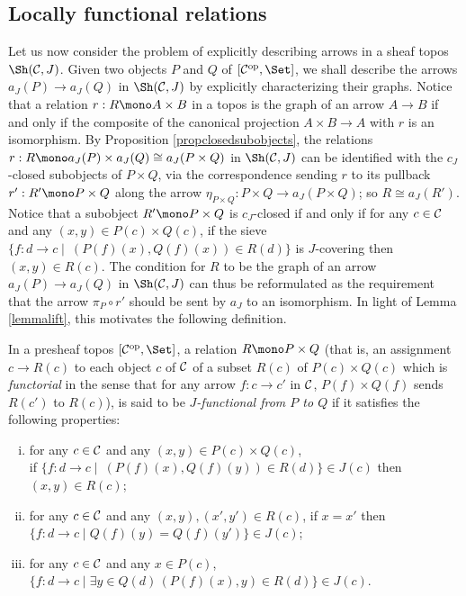 \documentclass[a4paper,12pt]{article}
\begin{document}
\subsection{Locally functional relations}

Let us now consider the problem of explicitly describing arrows in a sheaf topos $\Sh({\cal C}, J)$. Given two objects $P$ and $Q$ of $[{\cal C}^{\textup{op}}, \Set]$, we shall describe the arrows $a_{J}(P)\to a_{J}(Q)$ in $\Sh({\cal C}, J)$ by explicitly characterizing their graphs. Notice that a relation $r:R\mono A\times B$ in a topos is the graph of an arrow $A\to B$ if and only if the composite of the canonical projection $A\times B \to A$ with $r$ is an isomorphism. By Proposition \ref{propclosedsubobjects}, the relations $r:R\mono a_{J}(P)\times a_{J}(Q)\cong a_{J}(P\times Q)$ in $\Sh({\cal C}, J)$ can be identified with the $c_{J}$-closed subobjects of $P\times Q$, via the correspondence sending $r$ to its pullback $r':R'\mono P\times Q$ along the arrow $\eta_{P\times Q}:P\times Q \to a_{J}(P\times Q)$; so $R\cong a_{J}(R')$. Notice that a subobject $R'\mono P\times Q$ is $c_{J}$-closed if and only if for any $c\in {\cal C}$ and any $(x, y)\in P(c)\times Q(c)$, if the sieve $\{f:d\to c \mid\ (P(f)(x), Q(f)(x))\in R(d)\}$ is $J$-covering then $(x,y)\in R(c)$. The condition for $R$ to be the graph of an arrow $a_{J}(P)\to a_{J}(Q)$ in $\Sh({\cal C}, J)$ can thus be reformulated as the requirement that the arrow $\pi_{P}\circ r'$ should be sent by $a_{J}$ to an isomorphism. In light of Lemma \ref{lemmalift}, this motivates the following definition.

\begin{definition}\label{defJfunctionalrelation}
	In a presheaf topos $[{\cal C}^{\textup{op}}, \Set]$, a relation $R\mono P\times Q$ (that is, an assignment $c\to R(c)$ to each object $c$ of $\cal C$ of a subset $R(c)$ of $P(c)\times Q(c)$ which is \emph{functorial} in the sense that for any arrow $f:c\to c'$ in $\cal C$, $P(f)\times Q(f)$ sends $R(c')$ to $R(c)$), is said to be \emph{$J$-functional from $P$ to $Q$} if it satisfies the following properties:
	\begin{enumerate}[(i)]
		\item for any $c\in {\cal C}$ and any $(x, y)\in P(c)\times Q(c)$,\\ if $\{f:d\to c \mid\ (P(f)(x), Q(f)(y))\in R(d)\}\in J(c)$ then $(x,y)\in R(c)$;
		
		\item for any $c\in {\cal C}$ and any $(x, y), (x', y')\in R(c)$, if $x=x'$ then $\{f:d\to c \mid Q(f)(y)=Q(f)(y')\}\in J(c)$;
		
		\item for any $c\in {\cal C}$ and any $x\in P(c)$, $\{f:d\to c \mid \exists y\in Q(d) \,(P(f)(x), y)\in R(d) \}\in J(c)$.
	\end{enumerate}
\end{definition}
\end{document}
